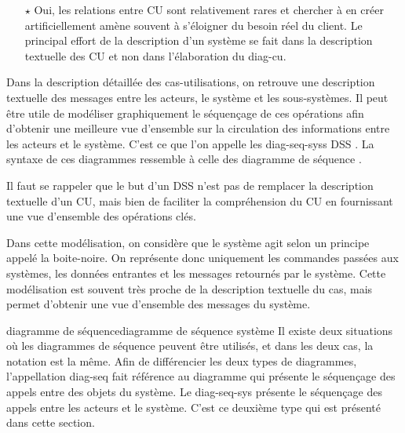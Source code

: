 \begin{itemize}
	\item[$\mathbf{\star}$] Oui, les relations entre \acrshort{CU} sont relativement rares et chercher à en créer artificiellement amène souvent à s'éloigner du besoin réel du client. Le principal effort de la description d'un système se fait dans la description textuelle des \acrshort{CU} et non dans l'élaboration du \gls{diag-cu}. 
\end{itemize}

\label{sec:dss}

Dans la description détaillée des \glspl{cas-utilisation}, on retrouve une description textuelle des messages entre les acteurs, le système et les sous-systèmes. Il peut être utile de modéliser graphiquement le séquençage de ces opérations afin d'obtenir une meilleure vue d'ensemble sur la circulation des informations entre les acteurs et le système. C'est ce que l'on appelle les \glspl{diag-seq-sys} \acrshort{DSS} . La syntaxe de ces diagrammes ressemble à celle des diagramme de séquence . \\

\begin{important}
	Il faut se rappeler que le but d'un \acrshort{DSS} n'est pas de remplacer la description textuelle d'un CU, mais bien de faciliter la compréhension du CU en fournissant une vue d'ensemble des opérations clés.
\end{important}

Dans cette modélisation, on considère que le système agit selon un principe appelé la \gls{boite-noire}. On représente donc uniquement les commandes passées aux systèmes, les données entrantes et les messages retournés par le système. Cette modélisation est souvent très proche de la description textuelle du cas, mais permet d'obtenir une vue d'ensemble des messages du système.

\begin{distinction}{diagramme de séquence}{diagramme de séquence système}
	Il existe deux situations où les diagrammes de séquence peuvent être utilisés, et dans les deux cas, la notation est la même. Afin de différencier les deux types de diagrammes, l'appellation \gls{diag-seq} fait référence au diagramme qui présente le séquençage des appels entre des objets du système. Le \gls{diag-seq-sys} présente le séquençage des appels entre les acteurs et le système. C'est ce deuxième type qui est présenté dans cette section.
\end{distinction}

